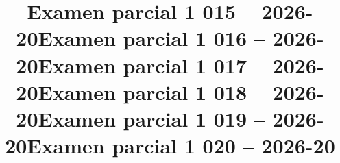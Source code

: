 \documentclass{exam}
\begin{document}

\newpage

\newpage
\programmingGrid
\newpage

\newpage

\cleartoeven
\setcounter{questioncounter}{0}
\setcounter{page}{1}
\title{Examen parcial 1 015 -- 2026-20}
\makeexamheader


\newpage
\programmingGrid
\newpage

\newpage

\newpage

\cleartoeven
\setcounter{questioncounter}{0}
\setcounter{page}{1}
\title{Examen parcial 1 016 -- 2026-20}
\makeexamheader


\newpage

\newpage
\programmingGrid
\newpage

\newpage

\cleartoeven
\setcounter{questioncounter}{0}
\setcounter{page}{1}
\title{Examen parcial 1 017 -- 2026-20}
\makeexamheader


\newpage

\newpage

\newpage
\programmingGrid
\newpage

\cleartoeven
\setcounter{questioncounter}{0}
\setcounter{page}{1}
\title{Examen parcial 1 018 -- 2026-20}
\makeexamheader


\newpage

\newpage
\programmingGrid
\newpage

\newpage

\cleartoeven
\setcounter{questioncounter}{0}
\setcounter{page}{1}
\title{Examen parcial 1 019 -- 2026-20}
\makeexamheader


\newpage
\programmingGrid
\newpage

\newpage

\newpage

\cleartoeven
\setcounter{questioncounter}{0}
\setcounter{page}{1}
\title{Examen parcial 1 020 -- 2026-20}
\makeexamheader


\newpage

\newpage
\programmingGrid
\newpage

\newpage
\end{document}
